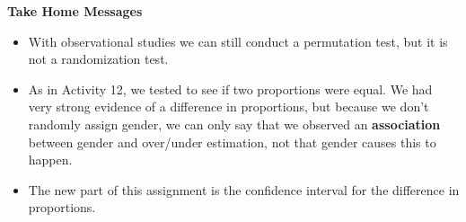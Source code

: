 \begin{center}
  {\bf Take Home Messages}
\end{center}
  \begin{itemize}
  \item With observational studies we can still conduct a permutation
    test, but it is not  a randomization test.
  \item As in Activity 12, we tested to see if  two proportions were
    equal. We had very strong evidence of a difference in proportions,
    but because we don't randomly assign gender, we can only say that
    we observed an {\bf association} between gender and over/under
    estimation, not that gender causes this to happen.
  \item The new part of this assignment is the confidence interval for
    the difference in proportions. 



      

\end{itemize}
